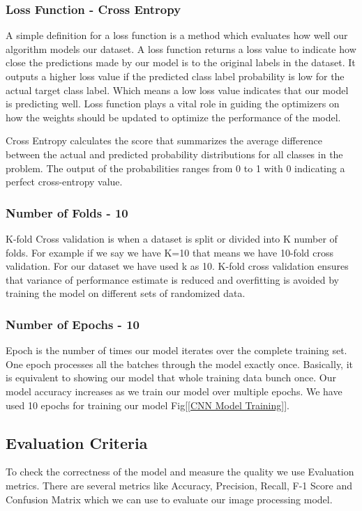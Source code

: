 \documentclass[conference]{IEEEtran}
\begin{document}
\vspace{5pt}
\subsubsection{Loss Function - Cross Entropy}
A simple definition for a loss function is a method which evaluates how well our algorithm models our dataset. A loss function returns a loss value to indicate how close the predictions made by our model is to the original labels in the dataset. It outputs a higher loss value if the predicted class label probability is low for the actual target class label. Which means a low loss value indicates that our model is predicting well. Loss function plays a vital role in guiding the optimizers on how the weights should be updated to optimize the performance of the model.
\par
Cross Entropy calculates the score that summarizes the average difference between the actual and predicted probability distributions for all classes in the problem. The output of the probabilities ranges from 0 to 1 with 0 indicating a perfect cross-entropy value.

\vspace{5pt}
\subsubsection{Number of Folds - 10}
K-fold Cross validation is when a dataset is split or divided into K number of folds. For example if we say we have K=10 that means we have 10-fold cross validation. For our dataset we have used k as 10. K-fold cross validation ensures that variance of performance estimate is reduced and overfitting is avoided by training the model on different sets of randomized data.

\vspace{5pt}
\subsubsection{Number of Epochs - 10}
Epoch is the number of times our model iterates over the complete training set. One epoch processes all the batches through the model exactly once. Basically, it is equivalent to showing our model that whole training data bunch once. Our model accuracy increases as we train our model over multiple epochs. We have used 10 epochs for training our model Fig[\ref{CNN Model Training}].  

\subsection{Evaluation Criteria}
To check the correctness of the model and measure the quality we use Evaluation metrics. There are several metrics like Accuracy, Precision, Recall, F-1 Score and Confusion Matrix which we can use to evaluate our image processing model.
\end{document}

